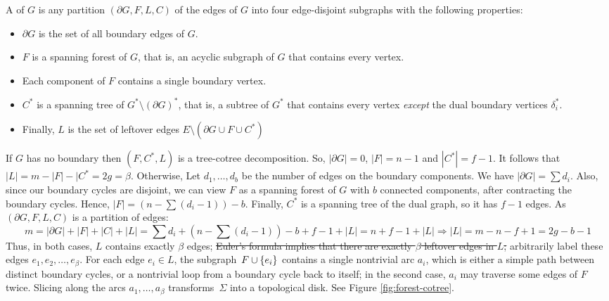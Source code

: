 \documentclass[letterpaper,review]{siamart190516}
\def\modified#1{\color{blue}#1 \color{black}}
\begin{document}
A  of $G$ is any partition $(\partial\! G, F, L, C)$ of the edges of $G$ into four edge-disjoint subgraphs with the following properties:
\begin{itemize}\itemsep0pt
\item $\partial\! G$ is the set of all boundary edges of $G$.
\item $F$ is a spanning forest of $G$, that is, an acyclic subgraph of $G$ that contains every vertex.
\item Each component of $F$ contains a single boundary vertex.
\item $C^*$ is a spanning tree of $G^*\setminus (\partial G)^*$, that is, a subtree of $G^*$ that contains every vertex \emph{except} the dual boundary vertices $\delta_i^*$.
\item Finally, $L$ is the set of leftover edges $E \setminus (\partial\!G \cup F \cup C^*)$
\end{itemize}

\noindent
\modified{
If $G$ has no boundary then $(F, C^*, L)$ is a tree-cotree decomposition. So, $|\partial\! G| = 0$, $|F| = n -1$ and $|C^*| = f-1$.  It follows that $|L| = m - |F| - |C^* = 2g = \beta$.
Otherwise, Let $d_1, \ldots, d_b$ be the number of edges on the boundary components.  
We have $|\partial\! G| = \sum{d_i}$.
Also, since our boundary cycles are disjoint, we can view $F$ as a spanning forest of $G$ with $b$ connected components, after contracting the boundary cycles.  Hence, $|F| = (n - \sum{(d_i-1)}) - b$.  Finally, $C^*$ is a spanning tree of the dual graph, so it has $f-1$ edges. As $(\partial\! G, F, L, C)$ is a partition of edges:
\[
m = |\partial\! G| + |F| + |C| + |L| = \sum{d_i} + (n - \sum{(d_i-1)}) - b + f-1 + |L| 
= n + f-1 + |L| \Rightarrow |L| = m - n - f + 1 = 2g - b - 1
\]
Thus, in both cases, $L$ contains exactly $\beta$ edges;
}
\sout{Euler's formula implies that there are exactly $\beta$ leftover edges in $L$;} arbitrarily label these edges $e_1, e_2, \dots, e_\beta$.  For each edge $e_i\in L$, the subgraph~$F\cup \{ e_i \}$ contains a single nontrivial arc $a_i$, which is either a simple path between distinct boundary cycles, or a nontrivial loop from a boundary cycle back to itself; in the second case, $a_i$ may traverse some edges of $F$ twice.  Slicing along the arcs $a_1, \dots, a_\beta$ transforms~$\Sigma$ into a topological disk. See Figure \ref{fig:forest-cotree}.
\end{document}
